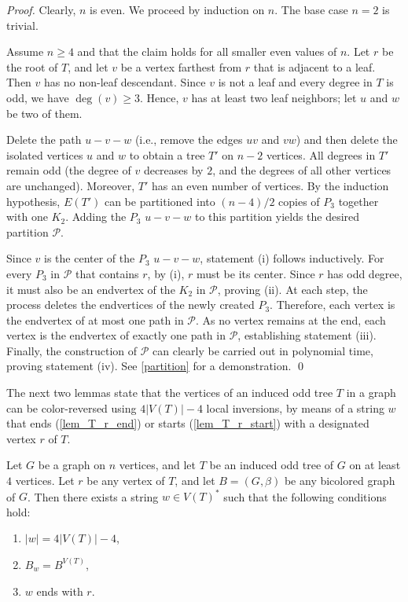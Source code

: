 \documentclass[runningheads,orivec]{llncs}
\begin{document}
\begin{proof}


Clearly, $n$ is even. 
We proceed by induction on $n$. The base case $n = 2$ is trivial.
 
Assume $n \ge 4$ and that the claim holds for all smaller even values of $n$. 
Let $r$ be the root of $T$, and let $v$ be a vertex farthest from $r$ that is adjacent to a leaf. Then $v$ has no non-leaf descendant. Since $v$ is not a leaf and every degree in $T$ is odd, we have $\deg(v) \ge 3$. Hence, $v$ has at least two leaf neighbors; let $u$ and $w$ be two of them.

Delete the path $u\!-\!v\!-\!w$ (i.e., remove the edges $uv$ and $vw$) and then delete the isolated vertices $u$ and $w$ to obtain a tree $T'$ on $n-2$ vertices. All degrees in $T'$ remain odd (the degree of $v$ decreases by $2$, and the degrees of all other vertices are unchanged). Moreover, $T'$ has an even number of vertices. By the induction hypothesis, $E(T')$ can be partitioned into $(n-4)/2$ copies of $P_3$ together with one $K_2$. Adding the $P_3$ $u\!-\!v\!-\!w$ to this partition yields the desired partition $\mathcal{P}$. 

Since $v$ is the center of the $P_3$ $u\!-\!v\!-\!w$, statement (i) follows inductively. 
For every $P_3$ in $\mathcal{P}$ that contains $r$, by (i), $r$ must be its center. Since $r$ has odd degree, it must also be an endvertex of the $K_2$ in $\mathcal{P}$, proving (ii).
At each step, the process deletes the endvertices of the newly created $P_3$. Therefore, each vertex is the endvertex of at most one path in $\mathcal{P}$. As no vertex remains at the end, each vertex is the endvertex of exactly one path in $\mathcal{P}$, establishing statement (iii). Finally, the construction of $\mathcal{P}$ can clearly be carried out in polynomial time, proving statement (iv). See \autoref{partition} for a demonstration.
\qed
\end{proof}
 
The next two lemmas state that the vertices of an induced odd tree $T$ in a graph can be color-reversed using $4|V(T)|-4$ local inversions, by means of a string $w$ that ends (\autoref{lem_T_r_end}) or starts (\autoref{lem_T_r_start}) with a designated vertex $r$ of $T$.

\begin{lemma}\label{lem_T_r_end}
Let $G$ be a graph on $n$ vertices, and let $T$ be an induced odd tree of $G$ on at least $4$ vertices. 
Let $r$ be any vertex of $T$, and let $B = (G, \beta)$ be any bicolored graph of $G$. 
Then there exists a string $w \in V(T)^*$ such that the following conditions hold:
\begin{enumerate}
    \item $|w| = 4|V(T)|-4$,
    \item $B_w = B^{V(T)}$,
    \item $w$ ends with $r$.
\end{enumerate}
\end{lemma}
\end{document}
